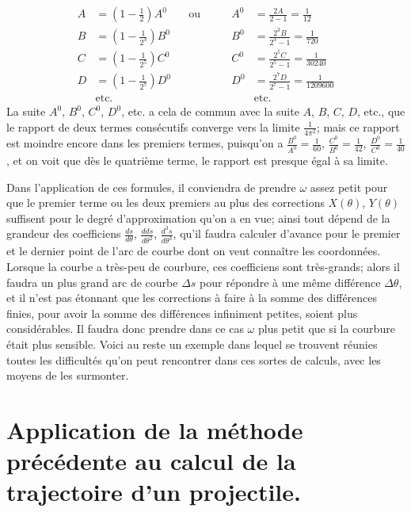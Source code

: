 \documentclass{article}
\begin{document}
\[ \begin{aligned} A&=\left(1-\frac{1}{2}\right)A^{0} &&\text{ou}\qquad & A^{0}&=\frac{2A}{2-1}=\frac{1}{12}\\ B&=\left(1-\frac{1}{2^{3}}\right)B^{0} &&& B^{0}&=\frac{2^{3}B}{2^{3}-1}=\frac{1}{720}\\ C&=\left(1-\frac{1}{2^{5}}\right)C^{0} &&& C^{0}&=\frac{2^{5}C}{2^{5}-1}=\frac{1}{30240}\\ D&=\left(1-\frac{1}{2^{7}}\right)D^{0} &&& D^{0}&=\frac{2^{7}D}{2^{7}-1}=\frac{1}{1209600}\\ &\text{etc.} &&& &\text{etc.} \end{aligned} \]
La suite $A^{0}$, $B^{0}$, $C^{0}$, $D^{0}$, etc. a cela de commun avec la suite $A$, $B$, $C$, $D$, etc., que le rapport de deux termes consécutifs converge vers la limite $\frac{1}{4\pi^{2}}$; mais ce rapport est moindre encore dans les premiers termes, puisqu'on a $\frac{B^{0}}{A^{0}}=\frac{1}{60}$, $\frac{C^{0}}{B^{0}}=\frac{1}{42}$, $\frac{D^{0}}{C^{0}}=\frac{1}{40}$, et on voit que dès le quatrième terme, le rapport est presque égal à sa limite.

Dans l'application de ces formules, il conviendra de prendre $\omega$ assez petit pour que le premier terme ou les deux premiers au plus des corrections $X(\theta)$, $Y(\theta)$ suffisent pour le degré d'approximation qu'on a en vue; ainsi tout dépend de la grandeur des coefficiens $\frac{ds}{d\theta}$, $\frac{dds}{d\theta^{2}}$, $\frac{d^{3}s}{d\theta^{3}}$, qu'il faudra calculer d'avance pour le premier et le dernier point de l'arc de courbe dont on veut connaître les coordonnées. Lorsque la courbe a très-peu de courbure, ces coefficiens sont très-grands; alors il faudra un plus grand arc de courbe $\Delta s$ pour répondre à une même différence $\Delta\theta$, et il n'est pas étonnant que les corrections à faire à la somme des différences finies, pour avoir la somme des différences infiniment petites, soient plus considérables. Il faudra donc prendre dans ce cas $\omega$ plus petit que si la courbure était plus sensible. Voici au reste un exemple dans lequel se trouvent réunies toutes les difficultés qu'on peut rencontrer dans ces sortes de calculs, avec les moyens de les surmonter.

\section*{Application de la méthode précédente au calcul de la trajectoire d'un projectile.}
\end{document}
